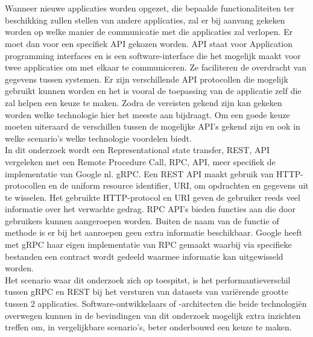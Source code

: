 
\chapter{}%
\label{ch:inleiding}

Wanneer nieuwe applicaties worden opgezet, die bepaalde functionaliteiten ter beschikking zullen stellen van andere applicaties, zal er bij aanvang gekeken worden
op welke manier de communicatie met die applicaties zal verlopen. Er moet dan voor een specifiek API gekozen worden.
API staat voor Application programming interfaces en is een software-interface die het mogelijk maakt voor twee
applicaties om met elkaar te communiceren. Ze faciliteren de overdracht van gegevens tussen systemen. Er zijn verschillende API protocollen die mogelijk gebruikt kunnen worden
en het is vooral de toepassing van de applicatie zelf die zal helpen een keuze te maken. Zodra de vereisten gekend zijn kan gekeken worden welke technologie hier
het meeste aan bijdraagt. Om een goede keuze moeten uiteraard de verschillen tussen de mogelijke API's gekend zijn en ook in welke scenario's welke technologie voordelen biedt.\\

In dit onderzoek wordt een Representational state transfer, REST, API vergeleken met een Remote Procedure Call, RPC, API, meer specifiek de
implementatie van Google nl. gRPC. Een REST API maakt gebruik van HTTP-protocollen en de uniform resource identifier, URI, om opdrachten en gegevens uit te wisselen.
Het gebruikte HTTP-protocol en URI geven de gebruiker reeds veel informatie over het verwachte gedrag.
RPC API's bieden functies aan die door gebruikers kunnen aangeroepen worden.
Buiten de naam van de functie of methode is er bij het aanroepen geen extra informatie beschikbaar.
Google heeft met gRPC haar eigen implementatie van RPC gemaakt waarbij via specifieke bestanden een contract wordt gedeeld waarmee informatie kan uitgewisseld worden.\\

Het scenario waar dit onderzoek zich op toespitst, is het performantieverschil tussen gRPC en REST bij het versturen van datasets van variërende grootte tussen 2 applicaties.
Software-ontwikkelaars of -architecten die beide technologi\"en overwegen kunnen in de bevindingen van dit onderzoek mogelijk extra inzichten treffen
om, in vergelijkbare scenario's, beter onderbouwd een keuze te maken.\\

